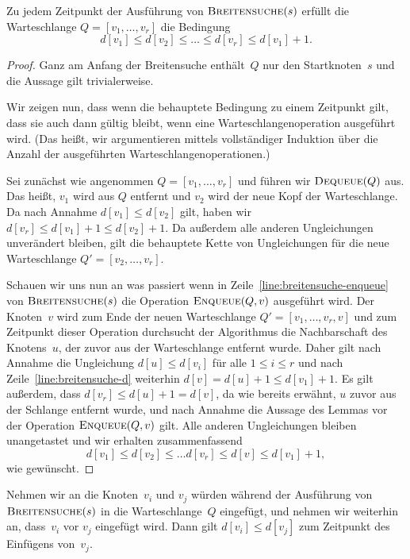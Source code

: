 \begin{lem}
\label{lem:breitensuche-warteschlange-monotonie}
Zu jedem Zeitpunkt der Ausführung von $\mathop{\text{\textsc{Breitensuche}}}(s)$ erfüllt die Warteschlange $Q=[v_1,\ldots,v_r]$ die Bedingung
\[
d[v_1] \leq d[v_2] \leq \ldots \leq d[v_r] \leq d[v_1] + 1.
\]
\end{lem}

\begin{proof}
Ganz am Anfang der Breitensuche enthält~$Q$ nur den Startknoten~$s$ und die Aussage gilt trivialerweise.

Wir zeigen nun, dass wenn die behauptete Bedingung zu einem Zeitpunkt gilt, dass sie auch dann gültig bleibt, wenn eine Warteschlangenoperation ausgeführt wird.
(Das heißt, wir argumentieren mittels vollständiger Induktion über die Anzahl der ausgeführten Warteschlangenoperationen.)

Sei zunächst wie angenommen $Q=[v_1,\ldots,v_r]$ und führen wir $\mathop{\text{\textsc{Dequeue}}}(Q)$ aus.
Das heißt, $v_1$ wird aus $Q$ entfernt und $v_2$ wird der neue Kopf der Warteschlange.
Da nach Annahme $d[v_1] \leq d[v_2]$ gilt, haben wir $d[v_r] \leq d[v_1]+1 \leq d[v_2]+1$.
Da außerdem alle anderen Ungleichungen unverändert bleiben, gilt die behauptete Kette von Ungleichungen für die neue Warteschlange $Q'=[v_2,\ldots,v_r]$.

Schauen wir uns nun an was passiert wenn in Zeile~\ref{line:breitensuche-enqueue} von $\mathop{\text{\textsc{Breitensuche}}}(s)$ die Operation $\mathop{\text{\textsc{Enqueue}}}(Q,v)$ ausgeführt wird.
Der Knoten~$v$ wird zum Ende der neuen Warteschlange $Q'=[v_1,\ldots,v_r,v]$ und zum Zeitpunkt dieser Operation durchsucht der Algorithmus die Nachbarschaft des Knotens~$u$, der zuvor aus der Warteschlange entfernt wurde.
Daher gilt nach Annahme die Ungleichung $d[u] \leq d[v_i]$ für alle $1 \leq i \leq r$ und nach Zeile~\ref{line:breitensuche-d} weiterhin $d[v] = d[u]+1 \leq d[v_1]+1$.
Es gilt außerdem, dass $d[v_r] \leq d[u]+1=d[v]$, da wie bereits erwähnt, $u$ zuvor aus der Schlange entfernt wurde, und nach Annahme die Aussage des Lemmas vor der Operation $\mathop{\text{\textsc{Enqueue}}}(Q,v)$ gilt.
Alle anderen Ungleichungen bleiben unangetastet und wir erhalten zusammenfassend
\[
d[v_1] \leq d[v_2] \leq \ldots d[v_r] \leq d[v] \leq d[v_1] + 1,
\]
wie gewünscht.
\end{proof}

\begin{kor}
\label{cor:breitensuche-warteschlange}
Nehmen wir an die Knoten~$v_i$ und $v_j$ würden während der Ausführung von $\mathop{\text{\textsc{Breitensuche}}}(s)$ in die Warteschlange~$Q$ eingefügt, und nehmen wir weiterhin an, dass~$v_i$ vor $v_j$ eingefügt wird.
Dann gilt $d[v_i] \leq d[v_j]$ zum Zeitpunkt des Einfügens von~$v_j$.
\end{kor}

